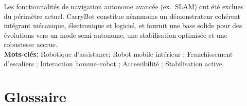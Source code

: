 \documentclass[12pt,a4paper]{article}
\begin{document}
Les fonctionnalit\'es de navigation autonome avanc\'ee (ex.~SLAM) ont \'et\'e exclues du p\'erim\`etre actuel. CarryBot constitue n\'eanmoins un d\'emonstrateur coh\'erent int\'egrant m\'ecanique, \'electronique et logiciel, et fournit une base solide pour des \'evolutions vers un mode semi-autonome, une stabilisation optimis\'ee et une robustesse accrue.\\

\textbf{Mots-clés:} Robotique d’assistance; Robot mobile intérieur ; Franchissement d’escaliers ; Interaction homme–robot ; Accessibilité ; Stabilisation active.

\newpage

\tableofcontents
\newpage

\listoffigures
{}

\newpage

\section*{Glossaire}
\end{document}

